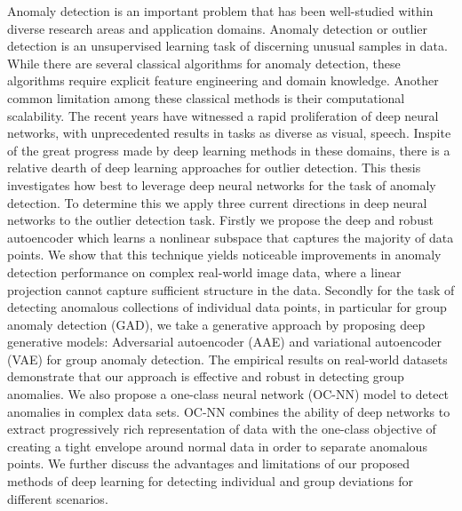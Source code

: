 %
%
{}
\vspace{-0.1cm}
Anomaly detection is an important problem that has been well-studied within diverse research areas and application domains. Anomaly detection or outlier detection is an unsupervised learning  task of discerning unusual samples in data. While there are several classical algorithms for anomaly detection, these algorithms require explicit feature engineering and domain knowledge. Another common limitation among these classical methods is their computational scalability. The recent years have witnessed a rapid proliferation of deep neural networks, with unprecedented results in tasks as diverse as visual, speech. Inspite of the great progress made by deep learning methods in these domains, there is a relative dearth of deep learning approaches for outlier detection. This thesis investigates how best to leverage deep neural networks for the task of anomaly detection. To determine this we apply three current directions in deep neural networks to the outlier detection task. Firstly we propose the deep and robust autoencoder  which learns a nonlinear subspace that captures the majority of data points. We show that this technique yields noticeable improvements in anomaly detection performance on complex real-world image data, where a linear projection cannot capture sufficient structure in the data. Secondly for the task of detecting anomalous collections of individual data points, in particular for group anomaly detection (GAD), we take a generative approach by proposing deep generative models: Adversarial autoencoder (AAE) and variational autoencoder (VAE) for group anomaly detection. The empirical results on real-world datasets demonstrate that our approach is effective and robust in detecting group anomalies. We also propose a one-class neural network (OC-NN) model to detect anomalies in complex data sets. OC-NN combines the ability of deep networks to extract progressively rich representation of data with the one-class objective of creating a tight envelope around normal data in order to separate anomalous points. We further discuss the advantages and limitations of our proposed methods of deep learning for detecting individual and  group deviations for different scenarios.











